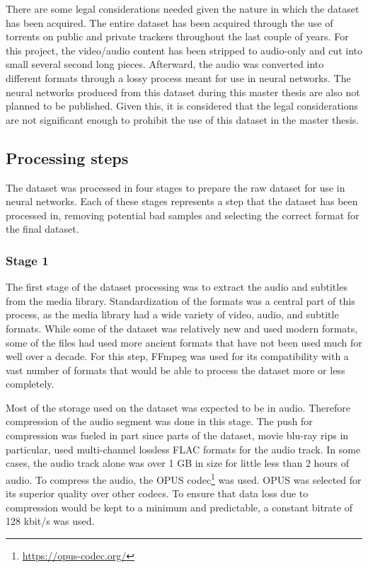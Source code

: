 There are some legal considerations needed given the nature in which the dataset has been acquired. 
The entire dataset has been acquired through the use of torrents on public and private trackers throughout the last couple of years. 
For this project, the video/audio content has been stripped to audio-only and cut into small several second long pieces. 
Afterward, the audio was converted into different formats through a lossy process meant for use in neural networks. 
The neural networks produced from this dataset during this master thesis are also not planned to be published. 
Given this, it is considered that the legal considerations are not significant enough to prohibit the use of this dataset in the master thesis.

\subsection{Processing steps}
The dataset was processed in four stages to prepare the raw dataset for use in neural networks.
Each of these stages represents a step that the dataset has been processed in, removing potential bad samples and selecting the correct format for the final dataset.

\subsubsection{Stage 1}
The first stage of the dataset processing was to extract the audio and subtitles from the media library.
Standardization of the formats was a central part of this process, as the media library had a wide variety of video, audio, and subtitle formats.
While some of the dataset was relatively new and used modern formats, some of the files had used more ancient formats that have not been used much for well over a decade.
For this step, FFmpeg was used for its compatibility with a vast number of formats that would be able to process the dataset more or less completely.

Most of the storage used on the dataset was expected to be in audio. 
Therefore compression of the audio segment was done in this stage.
The push for compression was fueled in part since parts of the dataset, movie blu-ray rips in particular, used multi-channel lossless FLAC formats for the audio track.
In some cases, the audio track alone was over 1 GB in size for little less than 2 hours of audio.
To compress the audio, the OPUS codec\footnote{\url{https://opus-codec.org/}} was used.
OPUS was selected for its superior quality over other codecs\cite{opus:tests}.
To ensure that data loss due to compression would be kept to a minimum and predictable, a constant bitrate of 128 kbit/s was used.


